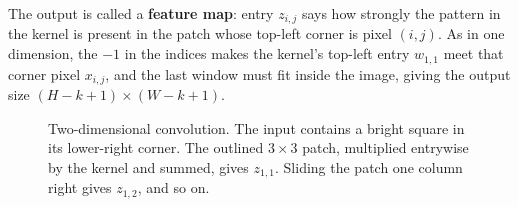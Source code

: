 \documentclass[12pt, a4paper]{article}
\providecommand{\bZ}{\mathbf{Z}}
\newcommand{\drawgrid}[3]{%
  \begin{scope}[shift={#1}]
    \foreach \row [count=\r] in {#3} {
        \foreach \v [count=\c] in \row {
            \draw[gray!70, fill=#2] (\c-1,-\r+1) rectangle ++(1,-1);
            \node[font=\small] at (\c-0.5,-\r+0.5) {$\v$};
          }
      }
  \end{scope}%
}
\begin{document}
The output is called a \textbf{feature map}: entry $z_{i,j}$ says how
strongly the pattern in the kernel is present in the patch whose top-left
corner is pixel $(i, j)$. As in one dimension, the $-1$ in the indices makes
the kernel's top-left entry $w_{1,1}$ meet that corner pixel $x_{i,j}$, and
the last window must fit inside the image, giving the output size
$(H - k + 1) \times (W - k + 1)$.

\begin{figure}[H]
  \centering
  \caption{Two-dimensional convolution. The input contains a bright square in
    its lower-right corner. The outlined $3\times3$ patch, multiplied entrywise
    by the kernel and summed, gives $z_{1,1}$. Sliding the patch one column
    right gives $z_{1,2}$, and so on.}
  \label{fig:conv2d}
\end{figure}
\end{document}
